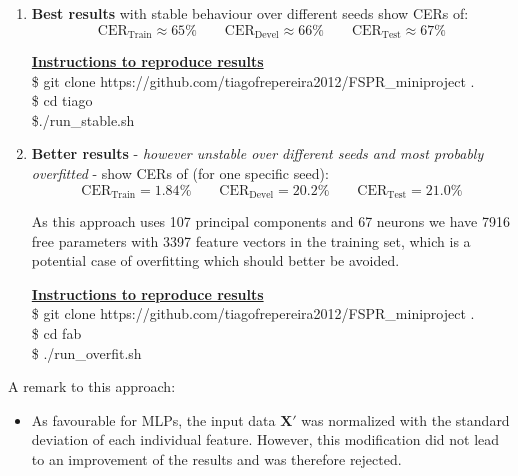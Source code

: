 \documentclass[a4paper,10pt,fleqn]{article}
\newcommand{\note}[1]{
\begin{boxitpara}{}%
\textbf{\underline{Instructions to reproduce results}} #1
\end{boxitpara}}
\begin{document}
\begin{enumerate}
\item \textbf{Best results} with stable behaviour over different seeds show CERs of:
$$ \textrm{CER}_{\textrm{Train}} \approx 65\% \qquad
\textrm{CER}_{\textrm{Devel}}\approx 66\%  \qquad
\textrm{CER}_{\textrm{Test}}\approx 67\%  $$

\note{\\ 
	\$ git clone https://github.com/tiagofrepereira2012/FSPR\_miniproject . \\
	\$ cd tiago \\
\$./run\_stable.sh
}

\item \textbf{Better results} - \textit{however unstable over different seeds and most probably overfitted} - show CERs of (for one specific seed):
$$ \textrm{CER}_{\textrm{Train}}=1.84\% \qquad
\textrm{CER}_{\textrm{Devel}}=20.2\% \qquad
\textrm{CER}_{\textrm{Test}}=21.0\% $$

As this approach uses 107 principal components and 67 neurons we have 7916 free parameters with 3397 feature vectors in the training set, which is a potential case of overfitting which should better be avoided.

\note{\\ 
	\$ git clone https://github.com/tiagofrepereira2012/FSPR\_miniproject . \\
	\$ cd fab \\
	\$ ./run\_overfit.sh 
}

\end{enumerate}
		

\vspace{1cm}
A remark to this approach:

\begin{itemize}
	\item As favourable for MLPs, the input data $\mathbf{X}'$ was normalized with the standard deviation of each individual feature. However, this modification did not lead to an improvement of the results and was therefore rejected.
\end{itemize}
\end{document}
